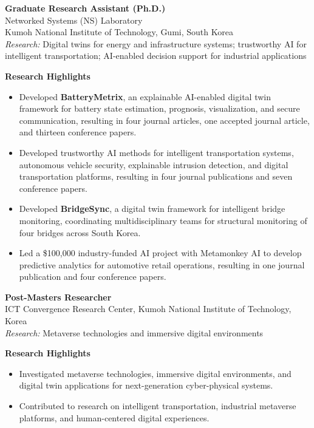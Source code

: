 \documentclass[11pt, letterpaper]{article}
\newcommand{\entry}[2]{%
  \begin{list}{}{%
    \setlength{\leftmargin}{0.17\linewidth}%
    \setlength{\labelwidth}{0.15\linewidth}%
    \setlength{\labelsep}{0.02\linewidth}%
    \setlength{\topsep}{3pt}%
    \setlength{\parsep}{2pt}%
    \setlength{\itemsep}{0pt}%
    \renewcommand{\makelabel}[1]{\parbox[t]{0.15\linewidth}{\small\raggedright\color{uwred}##1}\hfill}%
  }%
  \item[{#1}] #2%
  \end{list}%
}
\newcommand{\role}[1]{{\color{uwred}\textbf{#1}}}
\newcommand{\research}[1]{{\color{uwred}\textit{Research:}} #1}
\begin{document}
\entry{Sep 2022 --\\Aug 2025}{%
  \role{Graduate Research Assistant (Ph.D.)}\\
  Networked Systems (NS) Laboratory\\
  Kumoh National Institute of Technology, Gumi, South Korea\\
  \research{Digital twins for energy and infrastructure systems; trustworthy AI for intelligent transportation; AI-enabled decision support for industrial applications}


  \textbf{Research Highlights}
  \begin{itemize}
      \item Developed \textbf{BatteryMetrix}, an explainable AI-enabled digital twin framework for battery state estimation, prognosis, visualization, and secure communication, resulting in four journal articles, one accepted journal article, and thirteen conference papers.
      \item Developed trustworthy AI methods for intelligent transportation systems, autonomous vehicle security, explainable intrusion detection, and digital transportation platforms, resulting in four journal publications and seven conference papers.
      \item Developed \textbf{BridgeSync}, a digital twin framework for intelligent bridge monitoring, coordinating multidisciplinary teams for structural monitoring of four bridges across South Korea.
      \item Led a \$100,000 industry-funded AI project with Metamonkey AI to develop predictive analytics for automotive retail operations, resulting in one journal publication and four conference papers.
  \end{itemize}
}

\entry{Jan 2022 --\\Aug 2022}{%
  \role{Post-Masters Researcher}\\
  ICT Convergence Research Center, Kumoh National Institute of Technology, Korea\\
  \research{Metaverse technologies and immersive digital environments}


  \textbf{Research Highlights}
  \begin{itemize}
      \item Investigated metaverse technologies, immersive digital environments, and digital twin applications for next-generation cyber-physical systems.
      \item Contributed to research on intelligent transportation, industrial metaverse platforms, and human-centered digital experiences.
  \end{itemize}
}
\end{document}
